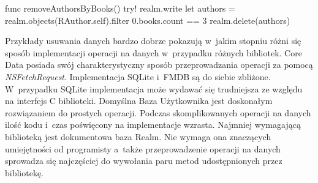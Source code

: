 \begin{code}[
		language=swift,
		caption={Przykład usuwania danych Realm},
		label={lis:realm_delete_code},
	]
    func removeAuthorsByBooks() {
        try! realm.write {
            let authors = realm.objects(RAuthor.self).filter { 0.books.count == 3 }
            realm.delete(authors)
        }
    }
\end{code}

Przykłady usuwania danych bardzo dobrze pokazują w~jakim stopniu różni się sposób implementacji operacji na danych w~przypadku różnych bibliotek. Core Data posiada swój charakterystyczny sposób przeprowadzania operacji za pomocą \textit{NSFetchRequest}. Implementacja SQLite i~FMDB są do siebie zbliżone. W~przypadku SQLite implementacja może wydawać się trudniejsza ze względu na interfejs C biblioteki. Domyślna Baza Użytkownika jest doskonałym rozwiązaniem do prostych operacji. Podczas skomplikowanych operacji na danych ilość kodu i~czas poświęcony na implementacje wzrasta. Najmniej wymagającą biblioteką jest dokumentowa baza Realm. Nie wymaga ona znaczących umiejętności od programisty a~także przeprowadzenie operacji na danych sprowadza się najczęściej do wywołania paru metod udostępnionych przez bibliotekę.